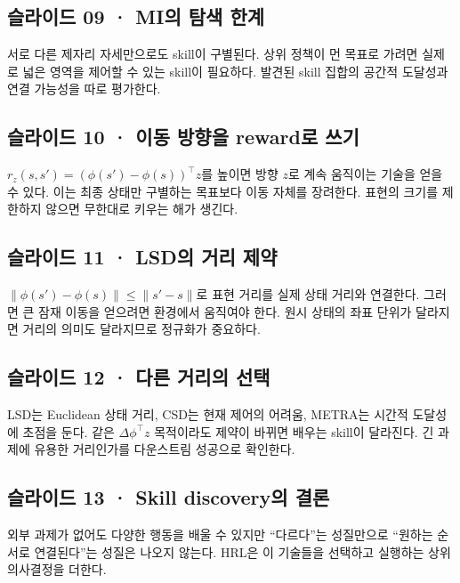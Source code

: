 \documentclass[11pt,a4paper]{article}
\begin{document}
\subsection{슬라이드 09 · MI의 탐색 한계}

서로 다른 제자리 자세만으로도 skill이 구별된다. 상위 정책이 먼 목표로 가려면 실제로 넓은 영역을 제어할 수 있는 skill이 필요하다. 발견된 skill 집합의 공간적 도달성과 연결 가능성을 따로 평가한다.\par

\subsection{슬라이드 10 · 이동 방향을 reward로 쓰기}

$r_z(s,s')=(\phi(s')-\phi(s))^\top z$를 높이면 방향 $z$로 계속 움직이는 기술을 얻을 수 있다. 이는 최종 상태만 구별하는 목표보다 이동 자체를 장려한다. 표현의 크기를 제한하지 않으면 무한대로 키우는 해가 생긴다.\par

\subsection{슬라이드 11 · LSD의 거리 제약}

$\|\phi(s')-\phi(s)\|\le\|s'-s\|$로 표현 거리를 실제 상태 거리와 연결한다. 그러면 큰 잠재 이동을 얻으려면 환경에서 움직여야 한다. 원시 상태의 좌표 단위가 달라지면 거리의 의미도 달라지므로 정규화가 중요하다.\par

\subsection{슬라이드 12 · 다른 거리의 선택}

LSD는 Euclidean 상태 거리, CSD는 현재 제어의 어려움, METRA는 시간적 도달성에 초점을 둔다. 같은 $\Delta\phi^\top z$ 목적이라도 제약이 바뀌면 배우는 skill이 달라진다. 긴 과제에 유용한 거리인가를 다운스트림 성공으로 확인한다.\par

\subsection{슬라이드 13 · Skill discovery의 결론}

외부 과제가 없어도 다양한 행동을 배울 수 있지만 “다르다”는 성질만으로 “원하는 순서로 연결된다”는 성질은 나오지 않는다. HRL은 이 기술들을 선택하고 실행하는 상위 의사결정을 더한다.\par
\end{document}
